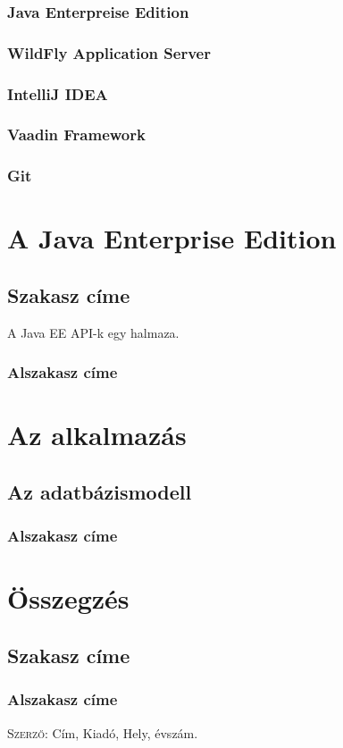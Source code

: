 \documentclass[centeredchapter]{thesis-ekf}
\theoremstyle{definition}
\theoremstyle{remark}
\begin{document}
\subsection{Java Enterpreise Edition}

\subsection{WildFly Application Server}

\subsection{IntelliJ IDEA}

\subsection{Vaadin Framework}

\subsection{Git}

\chapter{A Java Enterprise Edition}

\section{Szakasz címe}

A Java EE API-k egy halmaza.

\subsection{Alszakasz címe}

\chapter{Az alkalmazás}

\section{Az adatbázismodell}

\subsection{Alszakasz címe}

\chapter{Összegzés}

\section{Szakasz címe}

\subsection{Alszakasz címe}


\begin{thebibliography}{1}
 \textsc{Szerző}: Cím, Kiadó, Hely, évszám.
\end{thebibliography}
\end{document}
